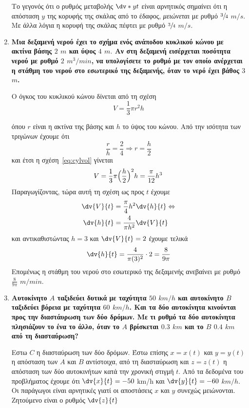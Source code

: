 \begin{enumerate}
\begin{solution}
      Το γεγονός ότι ο ρυθμός μεταβολής $\dv*{y}{t}$ είναι αρνητικός σημαίνει
      ότι η απόσταση $y$ της κορυφής της σκάλας από το έδαφος,
      \emph{μειώνεται} με ρυθμό $\sfrac{3}{4}$ $\si{m\per s}$. Με άλλα λόγια η
      κορυφή της σκάλας πέφτει με ρυθμό $\sfrac{3}{4}$ $\si{m\per s}$.
    \end{solution}

  \item {\bfseries \boldmath Μια δεξαμενή νερού έχει το σχήμα ενός ανάποδου
      κυκλικού κώνου με ακτίνα βάσης $2$ $\si{m}$ και ύψος $4$ $\si{m}.$ Αν
      στη δεξαμενή εισέρχεται ποσότητα νερού με ρυθμό $2$ $\si{m^{3}/min}$, να
      υπολογίσετε το ρυθμό με τον οποίο ανέρχεται η στάθμη του νερού στο εσωτερικό της
    δεξαμενής, όταν το νερό έχει βάθος $3$ $\si{m}$.}
    \begin{solution}
      Ο όγκος του κυκλικού κώνου δίνεται από τη σχέση
      \begin{equation} \label{eq:cylvol}
        V=\frac{1}{3}\pi r^{2} h
      \end{equation}

      όπου $r$ είναι η ακτίνα της βάσης και $h$ το ύψος του κώνου. Από την ισότητα των 
      τριγώνων έχουμε ότι
      \[
        \frac{r}{h} = \frac{2}{4} \Rightarrow r=\frac{h}{2}
      \]
      και έτσι η σχέση~\eqref{eq:cylvol} γίνεται
      \[
        V=\frac{1}{3}\pi\Bigl(\frac{h}{2}\Bigr)^{2}h = \frac{\pi}{12}h^{3}
      \]
      Παραγωγίζοντας, τώρα αυτή τη σχέση ως προς $t$ έχουμε
      \begin{align}\label{eq:volrate}
        \dv{V}{t}&=\frac{\pi}{4}h^{2}\dv{h}{t}  \notag \Leftrightarrow \\
        \dv{h}{t}&=\frac{4}{\pi h^{2}}\dv{V}{t}
      \end{align}
      και αντικαθιστώντας $h=3$ και $\dv{V}{t}=2$ έχουμε τελικά
      \[
        \dv{h}{t}=\frac{4}{\pi (3)^{2}}\cdot 2 = \frac{8}{9\pi}
      \]
      Επομένως η στάθμη του νερού στο εσωτερικό της δεξαμενής ανεβαίνει με ρυθμό
      $\frac{8}{9\pi}$ $\si{m/min}$.
    \end{solution}

  \item  {\bfseries \boldmath Αυτοκίνητο $A$ ταξιδεύει δυτικά με ταχύτητα $50$
      $\si{km\per h}$ και αυτοκίνητο $B$ ταξιδεύει βόρεια με ταχύτητα $60$
      $\si{km/h}$. Και τα δύο αυτοκίνητα κινούνται προς την διαστάυρωση των δύο δρόμων. 
      Με τι ρυθμό τα δύο αυτοκίνητα πλησιάζουν το ένα το άλλο, όταν το $A$ βρίσκεται 
    $0.3$ $\si{km}$ και το $B$ $0.4$ $\si{km}$ από τη διασταύρωση?}
    \begin{solution}
      Εστω $C$ η διασταύρωση των δύο δρόμων. Έστω επίσης $x=x(t)$ και $y=y(t)$ η 
      απόσταση των $A$ και $B$ αντίστοιχα, από τη διασταύρωση και $z=z(t)$ η απόσταση 
      των δύο αυτοκινήτων κατά την χρονική στιγμή $t$.
      Από τα δεδομένα του προβλήματος έχουμε ότι $\dv{x}{t}=-50$ \si{km/h} και
      $\dv{y}{t}=-60$ $\si{km/h}$. Οι παράγωγοι είναι αρνητικές γιατί οι αποστάσεις $x$ 
      και $y$ συνεχώς μειώνονται. Ζητούμενο είναι ο ρυθμός $\dv{z}{t}$


\end{solution}
\end{enumerate}
